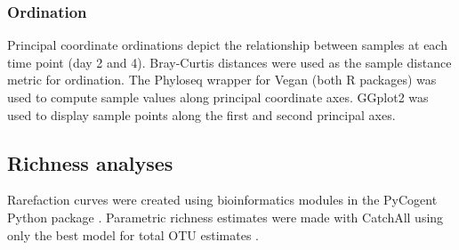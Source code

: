 \subsubsection{Ordination}
Principal coordinate ordinations depict the relationship between samples at
each time point (day 2 and 4). Bray-Curtis distances were used as the sample
distance metric for ordination. The Phyloseq \citep{24699258} wrapper for Vegan
\citep{vegan} (both R packages) was used to compute sample values along
principal coordinate axes. GGplot2 \citep{ggplot2} was used to display sample
points along the first and second principal axes.  

\subsection{Richness analyses} Rarefaction curves were created using
bioinformatics modules in the PyCogent Python package \citep{Knight_2007}.
Parametric richness estimates were made with CatchAll using only the best model
for total OTU estimates \citep{BUNGE_2010}.
